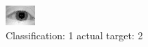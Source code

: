 \begin{figure}[h!]
\begin{center}
\includegraphics[width=0.60\columnwidth]{figures/ID952_class_1_target_2.png}
\end{center}
\caption{ Classification: 1 actual target: 2}
\label{fig:ID952_class_1_target_2}
\end{figure}
